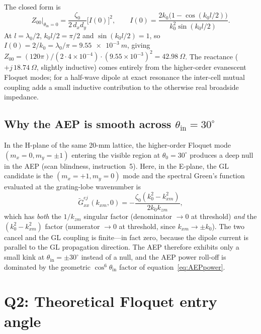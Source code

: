 \documentclass{article}
\begin{document}
The closed form is
\begin{equation}\label{eq:Z00}
Z_{00}\big|_{\theta_{\text{in}}=0} = \frac{\zeta_0}{2\,d_x d_y}\big[I(0)\big]^2,\qquad
I(0) = \frac{2k_0\big(1 - \cos(k_0 l/2)\big)}{k_0^2\sin(k_0 l/2)}.
\end{equation}
At $l = \lambda_0/2$, $k_0l/2 = \pi/2$ and $\sin(k_0l/2) = 1$, so $I(0) = 2/k_0 = \lambda_0/\pi = \SI{9.55e-3}{m}$, giving $Z_{00} = (120\pi)/(2 \cdot 4\times 10^{-4}) \cdot (9.55\times 10^{-3})^2 = \SI{42.98}{\Omega}$. The reactance ($+j\,\SI{18.74}{\Omega}$, slightly inductive) comes entirely from the higher-order evanescent Floquet modes; for a half-wave dipole at exact resonance the inter-cell mutual coupling adds a small inductive contribution to the otherwise real broadside impedance.

\subsection{Why the AEP is smooth across $\theta_{\text{in}} = 30^\circ$}

In the H-plane of the same 20-mm lattice, the higher-order Floquet mode $(m_x=0, m_y=\pm 1)$ entering the visible region at $\theta_0 = 30^\circ$ produces a deep null in the AEP (scan blindness, instruction~5). Here, in the E-plane, the GL candidate is the $(m_x=+1, m_y=0)$ mode and the spectral Green's function evaluated at the grating-lobe wavenumber is
\begin{equation}
\widetilde{G}_{xx}^{ej}(k_{xm},0) = -\frac{\zeta_0(k_0^2 - k_{xm}^2)}{2k_0 k_{zm}},
\end{equation}
which has \emph{both} the $1/k_{zm}$ singular factor (denominator $\to 0$ at threshold) \emph{and} the $(k_0^2 - k_{xm}^2)$ factor (numerator $\to 0$ at threshold, since $k_{xm}\to\pm k_0$). The two cancel and the GL coupling is finite---in fact zero, because the dipole current is parallel to the GL propagation direction. The AEP therefore exhibits only a small kink at $\theta_{\text{in}} = \pm 30^\circ$ instead of a null, and the AEP power roll-off is dominated by the geometric $\cos^6\theta_{\text{in}}$ factor of equation~\eqref{eq:AEPpower}.

\section{Q2: Theoretical Floquet entry angle}
\end{document}
